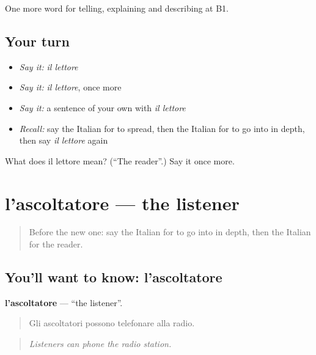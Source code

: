 \begin{grammarlens}[title={What you've built}]
One more word for telling, explaining and describing at B1.
\end{grammarlens}

\subsection*{Your turn}
\begin{itemize}
\raggedright
  \item \emph{Say it:} \emph{il lettore}
  \item \emph{Say it:} \emph{il lettore}, once more
  \item \emph{Say it:} a sentence of your own with \emph{il lettore}
  \item \emph{Recall:} say the Italian for to spread, then the Italian for to go into in depth, then say \emph{il lettore} again
\end{itemize}

\begin{tcolorbox}[breakable,colback=teal!4,colframe=teal!35!black,title={Before you move on}]
What does il lettore mean? (\textquotedblleft{}The reader\textquotedblright{}.) Say it once more.
\end{tcolorbox}
\section[l'ascoltatore]{l'ascoltatore — the listener}

\label{lesson:IT-C289-ascoltatore}



\begin{quote}
Before the new one: say the Italian for to go into in depth, then the Italian for the reader.
\end{quote}

\subsection*{You'll want to know: l'ascoltatore}
\textbf{l'ascoltatore} — \textquotedblleft{}the listener\textquotedblright{}.

\begin{quote}
Gli ascoltatori possono telefonare alla radio.
\end{quote}

\begin{quote}
\emph{Listeners can phone the radio station.}
\end{quote}

